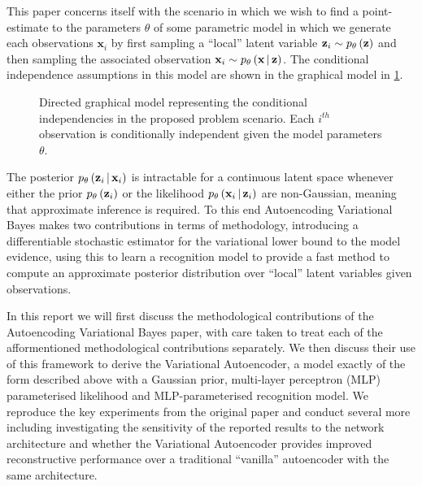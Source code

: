 \documentclass[../report.tex]{subfiles}
\begin{document}
This paper concerns itself with the scenario in which we wish to find a point-estimate to the parameters $\theta$ of some parametric model in which we generate each observations $\mathbf{x}_i$ by first sampling a ``local'' latent variable $\mathbf{z}_i \sim p_\theta \left( \mathbf{z}\right)$ and then sampling the associated observation $\mathbf{x}_i \sim p_\theta \left(\mathbf{x} \, \middle\vert \, \mathbf{z} \right)$. The conditional independence assumptions in this model are shown in the graphical model in \ref{fig:graph}.

\begin{figure}[!htbp]
\centering
{}
\caption{\label{fig:graph}Directed graphical model representing the conditional independencies in the proposed problem scenario. Each $i^{th}$ observation is conditionally independent given the model parameters $\theta$.}
\end{figure}

The posterior $p_\theta \left(\mathbf{z}_i \, \middle\vert \, \mathbf{x}_i \right)$ is intractable for a continuous latent space whenever either the prior $p_\theta \left( \mathbf{z}_i\right)$ or the likelihood $p_\theta \left(\mathbf{x}_i \, \middle\vert \, \mathbf{z}_i \right)$ are non-Gaussian, meaning that approximate inference is required. To this end Autoencoding Variational Bayes makes two contributions in terms of methodology, introducing a differentiable stochastic estimator for the variational lower bound to the model evidence, using this to learn a recognition model to provide a fast method to compute an approximate posterior distribution over ``local'' latent variables given observations.

In this report we will first discuss the methodological contributions of the Autoencoding Variational Bayes paper, with care taken to treat each of the afformentioned methodological contributions separately. We then discuss their use of this framework to derive the Variational Autoencoder, a model exactly of the form described above with a Gaussian prior, multi-layer perceptron (MLP) parameterised likelihood and MLP-parameterised recognition model. We reproduce the key experiments from the original paper and conduct several more including investigating the sensitivity of the reported results to the network architecture and whether the Variational Autoencoder provides improved reconstructive performance over a traditional ``vanilla'' autoencoder with the same architecture.
\end{document}
